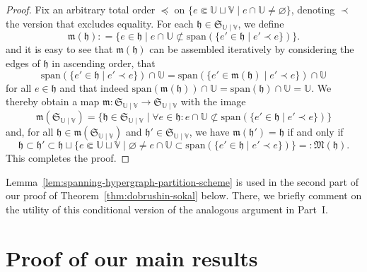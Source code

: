 \documentclass[reqno, 11pt]{amsart}
\theoremstyle{definition}
\newcommand{\V}{\mathbb V}
\newcommand{\U}{\mathbb U}
\begin{document}
\begin{proof}
	Fix an arbitrary total order $\preceq$ on $\{e \Subset \U \sqcup \V \mid e \cap \U \neq \varnothing\}$, denoting $\prec$ the version that excludes equality. 
	For each $\mathfrak h \in \mathfrak S_{\U \mid \V}$, we define
	\[
		\mathfrak m(\mathfrak h) : = \{e \in \mathfrak h \mid e \cap \U \not\subset \mathrm{span}(\{e' \in \mathfrak h \mid e' \prec e\})\}.
	\]
	and it is easy to see that $\mathfrak m(\mathfrak h)$ can be assembled iteratively by considering the edges of $\mathfrak h$ in ascending order, that
	\[
		\mathrm{span}(\{e' \in \mathfrak h \mid e' \prec e\}) \cap \U = \mathrm{span}(\{e' \in \mathfrak m(\mathfrak h) \mid e' \prec e\}) \cap \U
	\]
	for all $e \in \mathfrak h$ and that indeed $\mathrm{span}(\mathfrak m(\mathfrak h)) \cap \U = \mathrm{span}(\mathfrak h) \cap \U = \U$. 
	We thereby obtain a map $\mathfrak m : \mathfrak S_{\U \mid \V} \to \mathfrak S_{\U \mid \V}$ with the image
	\[
		\mathfrak m(\mathfrak S_{\U \mid \V}) = \{\mathfrak h \in \mathfrak S_{\U \mid \V} \mid \forall e \in \mathfrak h : e \cap \U \not\subset \mathrm{span}(\{e' \in \mathfrak h \mid e' \prec e\})\}
	\]
	and, for all $\mathfrak h \in \mathfrak m(\mathfrak S_{\U \mid \V})$ and $\mathfrak h' \in \mathfrak S_{\U \mid \V}$, we have $\mathfrak m(\mathfrak h') = \mathfrak h$ if and only if
	\[
		\mathfrak h \subset \mathfrak h' \subset \mathfrak h \sqcup \{e \Subset \U \sqcup \V \mid \varnothing \neq e \cap \U \subset \mathrm{span}(\{e' \in \mathfrak h \mid e' \prec e\})\} = : \mathfrak M(\mathfrak h).
	\]
	This completes the proof.
\end{proof}

Lemma~\ref{lem:spanning-hypergraph-partition-scheme} is used in the second part of our proof of Theorem~\ref{thm:dobrushin-sokal} below. 
There, we briefly comment on the utility of this conditional version of the analogous argument in Part~I.

\section{Proof of our main results} \label{sec:proof-main}
\end{document}
